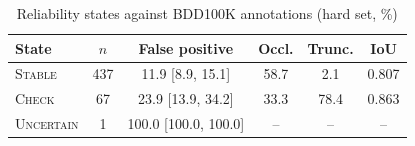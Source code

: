 \begin{table}[t]
\centering
\caption{Reliability states against BDD100K annotations (hard set, \%)}
\label{tab:states_hard}
\footnotesize
\setlength{\tabcolsep}{3pt}
\begin{tabular}{lccccc}
\hline
State & $n$ & False positive & Occl. & Trunc. & IoU \\
\hline
\textsc{Stable} & 437 & 11.9 [8.9, 15.1] & 58.7 & 2.1 & 0.807 \\
\textsc{Check} & 67 & 23.9 [13.9, 34.2] & 33.3 & 78.4 & 0.863 \\
\textsc{Uncertain} & 1 & 100.0 [100.0, 100.0] & -- & -- & -- \\
\hline
\end{tabular}
\end{table}

